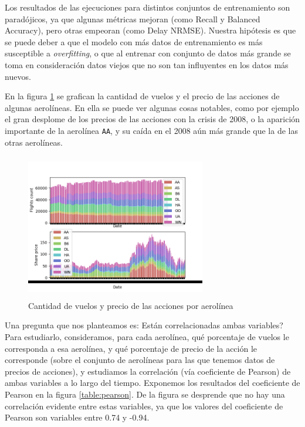 Los resultados de las ejecuciones para distintos conjuntos de entrenamiento son parad\'ojicos, ya
que algunas m\'etricas mejoran (como Recall y Balanced Accuracy), pero otras empeoran
(como Delay NRMSE). Nuestra hip\'otesis es que se puede deber a que el modelo con m\'as datos
de entrenamiento es m\'as susceptible a \textit{overfitting}, o que al entrenar con conjunto de datos
m\'as grande se toma en consideraci\'on datos viejos que no son tan influyentes en los datos m\'as nuevos.

En la figura \ref{fig:flights_and_stock_prices} se grafican la cantidad de vuelos y el precio de las acciones
de algunas aerol\'ineas. En ella se puede ver algunas cosas notables, como por ejemplo el gran desplome
de los precios de las acciones con la crisis de 2008, o la aparici\'on importante de la aerol\'inea \texttt{AA},
y su ca\'ida en el 2008 a\'un m\'as grande que la de las otras aerol\'ineas.

\begin{figure}[hbtp]
  \centering
  \includegraphics[width=0.7\textwidth, height=2.5in]{plots/flights_and_stock_prices.png}
  \caption{Cantidad de vuelos y precio de las acciones por aerol\'inea}
  \label{fig:flights_and_stock_prices}
\end{figure}

Una pregunta que nos planteamos es: \textquestiondown Est\'an correlacionadas ambas variables? Para
estudiarlo, consideramos, para cada aerol\'inea, qu\'e porcentaje de vuelos le corresponda a esa
aerol\'inea, y qu\'e porcentaje de precio de la acci\'on le corresponde (sobre el conjunto de aerol\'ineas para
las que tenemos datos de precios de acciones), y estudiamos la correlaci\'on (v\'ia coeficiente
de Pearson) de ambas variables a lo largo del tiempo. Exponemos los resultados del coeficiente de Pearson en la figura
\ref{table:pearson}. De la figura se desprende que no hay una correlaci\'on evidente entre estas variables,
ya que los valores del coeficiente de Pearson son variables entre 0.74 y -0.94.

